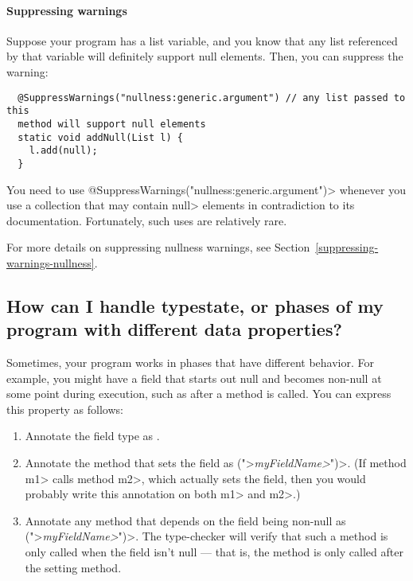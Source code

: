 \paragraph{Suppressing warnings\label{faq-list-map-nonnull-typeargs-suppressing-warnings}}

Suppose your program has a list variable, and you know that any list referenced
by that variable will definitely support null elements.  Then, you can suppress the
warning:

\begin{Verbatim}
  @SuppressWarnings("nullness:generic.argument") // any list passed to this
  method will support null elements
  static void addNull(List l) {
    l.add(null);
  }
\end{Verbatim}

\noindent
You need to use \<@SuppressWarnings("nullness:generic.argument")>
whenever you use a collection that may contain \<null> elements in
contradiction to its documentation.  Fortunately, such uses are relatively
rare.


For more details on suppressing nullness warnings, see
Section~\ref{suppressing-warnings-nullness}.


\subsection{How can I handle typestate, or phases of my program with different data properties?\label{faq-typestate}}

Sometimes, your program works in phases that have different behavior.  For
example, you might have a field that starts out null and becomes non-null
at some point during execution, such as after a method is called.  You can
express this property as follows:

\begin{enumerate}
\item
Annotate the field type as .
\item
Annotate the method that sets the field as \<(">\emph{\<myFieldName>}\<")>.
(If method \<m1> calls method \<m2>, which actually sets the field, then
you would probably write this annotation on both \<m1> and \<m2>.)
\item
Annotate any method that depends on the field being non-null as
\<(">\emph{\<myFieldName>}\<")>.
The type-checker will verify that such a method is only called when the
field isn't null --- that is, the method is only called after the setting
method.
\end{enumerate}

